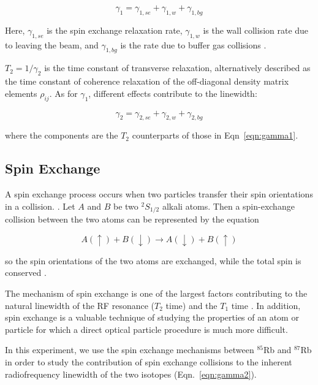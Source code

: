 \begin{equation}
\gamma_1 = \gamma_{1,se} + \gamma_{1,w} + \gamma_{1,bg} 
\label{eqn:gamma1}
\end{equation}

Here, $\gamma_{1,se}$ is the spin exchange relaxation rate,
$\gamma_{1,w}$ is the wall collision rate due to leaving the beam, and
$\gamma_{1,bg}$ is the rate due to buffer gas collisions
\cite{vanier}.

$T_2 = 1/\gamma_2$ is the time constant of transverse relaxation,
alternatively described as the time constant of coherence relaxation
of the off-diagonal density matrix elements $\rho_{ij}$. As for $\gamma_1$, different effects contribute to the linewidth:

\begin{equation}
\gamma_2 = \gamma_{2,se} + \gamma_{2,w} + \gamma_{2,bg} 
\label{eqn:gamma2}
\end{equation} 
 
where the components are the $T_2$ counterparts of those in
Eqn~\ref{eqn:gamma1}.

\subsection{Spin Exchange}\label{spinexchange}

A spin exchange process occurs when two particles transfer their spin orientations in a collision. \cite{bernheim}. Let $A$ and $B$ be two $^2S_{1/2}$
alkali atoms. Then a spin-exchange collision between the two atoms
can be represented by the equation

\begin{equation}
A(\uparrow) + B(\downarrow) \rightarrow A(\downarrow) + B(\uparrow)
\end{equation}

so the spin orientations of the two atoms are exchanged, while the
total spin is conserved \cite{happer}.  

The mechanism of spin exchange is one of the largest factors
contributing to the natural linewidth of the RF resonance ($T_2$ time) and
the $T_1$ time \cite{vanier}. In addition, spin exchange is a valuable
technique of studying the properties of an atom or particle for which
a direct optical particle procedure is much more difficult.

In this experiment, we use the spin exchange mechanisms between
$^{85}$Rb and $^{87}$Rb in order to study the contribution of spin
exchange collisions to the inherent radiofrequency linewidth of the two isotopes
(Eqn.~\ref{eqn:gamma2}).


